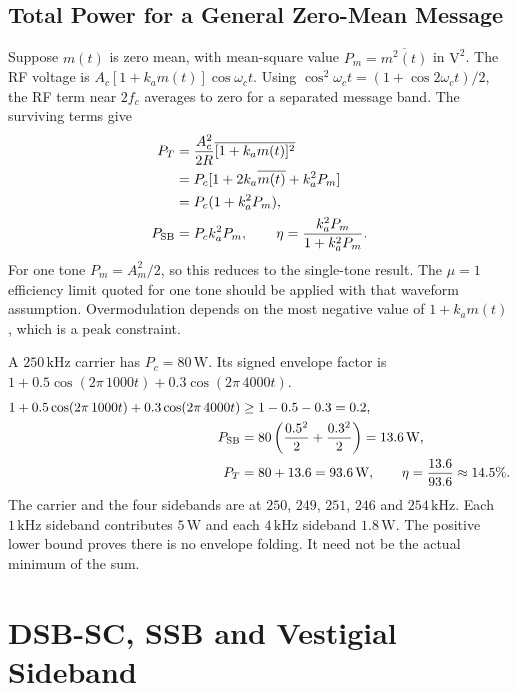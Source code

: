 \documentclass[12pt,a4paper]{article}
\begin{document}
\subsection{Total Power for a General Zero-Mean Message}
Suppose $m(t)$ is zero mean, with mean-square value $P_m=\overline{m^2(t)}$ in $\mathrm{V^2}$. The RF voltage is $A_c[1+k_am(t)]\cos\omega_ct$. Using $\cos^2\omega_ct=(1+\cos2\omega_ct)/2$, the RF term near $2f_c$ averages to zero for a separated message band. The surviving terms give
\[
\begin{aligned}
 P_T &= \frac{A_c^2}{2R}\overline{[1+k_am(t)]^2}\\
     &= P_c[1+2k_a\overline{m(t)}+k_a^2P_m]\\
     &= P_c(1+k_a^2P_m),\\
 P_{\rm SB}&=P_c k_a^2P_m,\qquad
 \eta=\frac{k_a^2P_m}{1+k_a^2P_m}.
\end{aligned}
\]
For one tone $P_m=A_m^2/2$, so this reduces to the single-tone result. The $\mu=1$ efficiency limit quoted for one tone should be applied with that waveform assumption. Overmodulation depends on the most negative value of $1+k_am(t)$, which is a peak constraint.

\begin{tcolorbox}[examplebox, title={Two-Tone AM from Envelope Constraint to Transmitted Power}]
A $250\,\mathrm{kHz}$ carrier has $P_c=80\,\mathrm W$. Its signed envelope factor is
$1+0.5\cos(2\pi\,1000t)+0.3\cos(2\pi\,4000t)$.
\[
\begin{aligned}
 1+0.5\cos(2\pi\,1000t)+0.3\cos(2\pi\,4000t)&\ge 1-0.5-0.3=0.2,\\
 P_{\rm SB}&=80\left(\frac{0.5^2}{2}+\frac{0.3^2}{2}\right)
              =13.6\,\mathrm W,\\
 P_T&=80+13.6=93.6\,\mathrm W,\qquad
 \eta=\frac{13.6}{93.6}\approx14.5\%.
\end{aligned}
\]
The carrier and the four sidebands are at $250$, $249$, $251$, $246$ and $254\,\mathrm{kHz}$. Each $1\,\mathrm{kHz}$ sideband contributes $5\,\mathrm W$ and each $4\,\mathrm{kHz}$ sideband $1.8\,\mathrm W$. The positive lower bound proves there is no envelope folding. It need not be the actual minimum of the sum.
\end{tcolorbox}

\section{DSB-SC, SSB and Vestigial Sideband}
\end{document}

